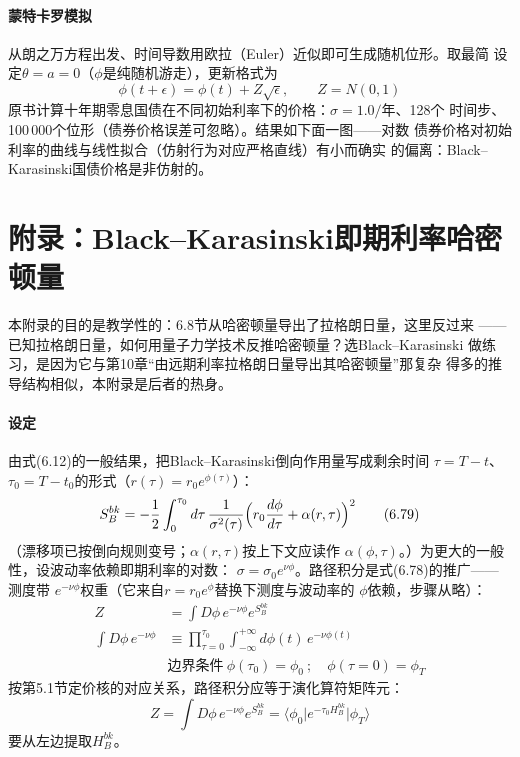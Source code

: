 \paragraph{蒙特卡罗模拟}
从朗之万方程出发、时间导数用欧拉（Euler）近似即可生成随机位形。取最简
设定$\theta=a=0$（$\phi$是纯随机游走），更新格式为
\begin{equation*}
\phi(t+\epsilon)=\phi(t)+Z\sqrt{\epsilon},\qquad Z=N(0,1)
\end{equation*}
原书计算十年期零息国债在不同初始利率下的价格：$\sigma=1.0/$年、128个
时间步、100\,000个位形（债券价格误差可忽略）。结果如下面一图——对数
债券价格对初始利率的曲线与线性拟合（仿射行为对应严格直线）有小而确实
的偏离：Black--Karasinski国债价格是非仿射的。


\section{附录：Black--Karasinski即期利率哈密顿量}

本附录的目的是教学性的：6.8节从哈密顿量导出了拉格朗日量，这里反过来
——已知拉格朗日量，如何用量子力学技术反推哈密顿量？选Black--Karasinski
做练习，是因为它与第10章“由远期利率拉格朗日量导出其哈密顿量”那复杂
得多的推导结构相似，本附录是后者的热身。

\paragraph{设定}
由式(6.12)的一般结果，把Black--Karasinski倒向作用量写成剩余时间
$\tau=T-t$、$\tau_0=T-t_0$的形式（$r(\tau)=r_0e^{\phi(\tau)}$）：
\begin{equation*}
S_B^{bk}=-\frac{1}{2}\int_{0}^{\tau_0}d\tau\,\frac{1}{\sigma^2(\tau)}
\Bigl(r_0\frac{d\phi}{d\tau}+\alpha(r,\tau)\Bigr)^2
\tag{6.79}
\end{equation*}
（漂移项已按倒向规则变号；$\alpha(r,\tau)$按上下文应读作
$\alpha(\phi,\tau)$。）为更大的一般性，设波动率依赖即期利率的对数：
$\sigma=\sigma_0e^{\nu\phi}$。路径积分是式(6.78)的推广——测度带
$e^{-\nu\phi}$权重（它来自$r=r_0e^{\phi}$替换下测度与波动率的
$\phi$依赖，步骤从略）：
\begin{align*}
Z&=\int D\phi\,e^{-\nu\phi}e^{S_B^{bk}}\\
\int D\phi\,e^{-\nu\phi}&\equiv\prod_{\tau=0}^{\tau_0}
\int_{-\infty}^{+\infty}d\phi(t)\,e^{-\nu\phi(t)}\\
&\text{边界条件}\ \phi(\tau_0)=\phi_0\ ;\quad \phi(\tau=0)=\phi_T
\tag{6.80}
\end{align*}
按第5.1节定价核的对应关系，路径积分应等于演化算符矩阵元：
\begin{equation*}
Z=\int D\phi\,e^{-\nu\phi}e^{S_B^{bk}}
=\langle\phi_0\vert e^{-\tau_0H_B^{bk}}\vert\phi_T\rangle
\tag{6.81}
\end{equation*}
要从左边提取$H_B^{bk}$。

